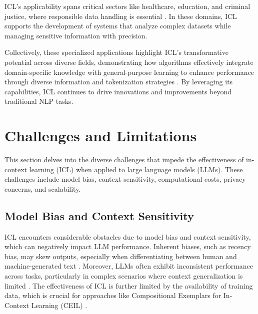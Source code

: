 ICL's applicability spans critical sectors like healthcare, education, and criminal justice, where responsible data handling is essential \cite{pawelczyk2023context}. In these domains, ICL supports the development of systems that analyze complex datasets while managing sensitive information with precision.

Collectively, these specialized applications highlight ICL's transformative potential across diverse fields, demonstrating how algorithms effectively integrate domain-specific knowledge with general-purpose learning to enhance performance through diverse information and tokenization strategies \cite{EnhancingI2,jeon2024informationtheoreticanalysisincontextlearning,kirsch2024generalpurposeincontextlearningmetalearning}. By leveraging its capabilities, ICL continues to drive innovations and improvements beyond traditional NLP tasks.









\section{Challenges and Limitations} \label{sec:Challenges and Limitations}

This section delves into the diverse challenges that impede the effectiveness of in-context learning (ICL) when applied to large language models (LLMs). These challenges include model bias, context sensitivity, computational costs, privacy concerns, and scalability.


\subsection{Model Bias and Context Sensitivity} \label{subsec:Model Bias and Context Sensitivity}



ICL encounters considerable obstacles due to model bias and context sensitivity, which can negatively impact LLM performance. Inherent biases, such as recency bias, may skew outputs, especially when differentiating between human and machine-generated text \cite{nguyen2023incontextexampleselectioninfluences}. Moreover, LLMs often exhibit inconsistent performance across tasks, particularly in complex scenarios where context generalization is limited \cite{abedsoltan2024contextscalingversustaskscalingincontext}. The effectiveness of ICL is further limited by the availability of training data, which is crucial for approaches like Compositional Exemplars for In-Context Learning (CEIL) \cite{ye2023compositionalexemplarsincontextlearning}. 

